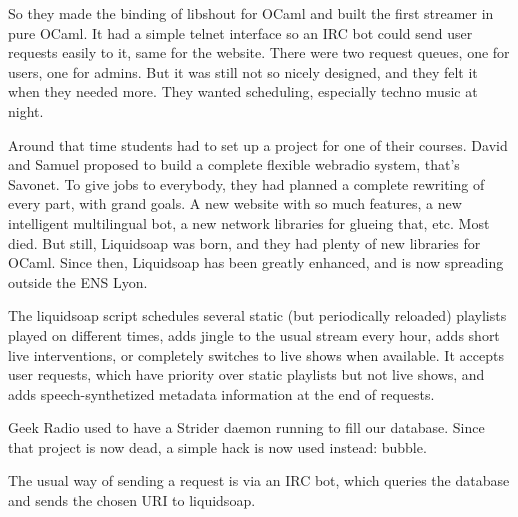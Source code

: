 \documentclass{book}
\begin{document}
So they made the binding of libshout for OCaml and built the first streamer in
pure OCaml. It had a simple telnet interface so an IRC bot could send user
requests easily to it, same for the website. There were two request queues, one
for users, one for admins. But it was still not so nicely designed, and they
felt it when they needed more. They wanted scheduling, especially techno music
at night.

Around that time students had to set up a project for one of their
courses. David and Samuel proposed to build a complete flexible webradio system,
that's Savonet. To give jobs to everybody, they had planned a complete rewriting
of every part, with grand goals. A new website with so much features, a new
intelligent multilingual bot, a new network libraries for glueing that,
etc. Most died. But still, Liquidsoap was born, and they had plenty of new
libraries for OCaml. Since then, Liquidsoap has been greatly enhanced, and is
now spreading outside the ENS Lyon.

The liquidsoap script schedules several static (but periodically reloaded)
playlists played on different times, adds jingle to the usual stream every hour,
adds short live interventions, or completely switches to live shows when
available. It accepts user requests, which have priority over static playlists
but not live shows, and adds speech-synthetized metadata information at the end
of requests.

Geek Radio used to have a Strider daemon running to fill our database. Since
that project is now dead, a simple hack is now used instead: bubble.

The usual way of sending a request is via an IRC bot, which queries the database
and sends the chosen URI to liquidsoap.
\end{document}
